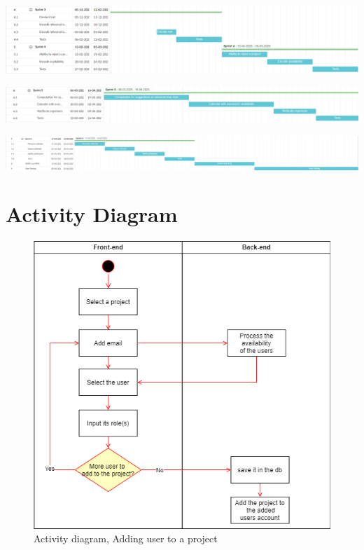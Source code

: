 \documentclass[11pt]{article}
\begin{document}
\vspace{1cm}
\hspace{-1.5cm}
\includegraphics[scale=0.75]{g3.png} 

\vspace{1cm}
\hspace{-1.5cm}
\includegraphics[scale=0.71]{g4.png} 

\vspace{1cm}
\hspace{-1.5cm}
\includegraphics[scale=0.5]{g5.png} 


\vspace{1.5cm}

\section{Activity Diagram}

\begin{figure}[htbp!]
    \centering
    \includegraphics[scale=0.5]{projectinit.drawio.png}
    \caption{Activity diagram, Adding user to a project}
\end{figure}
\end{document}
